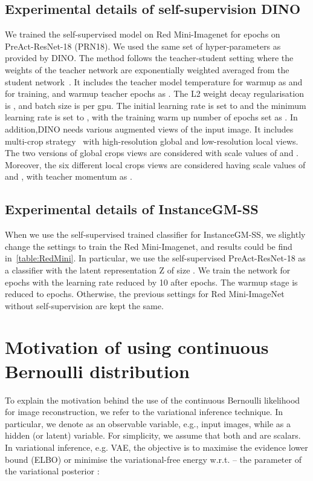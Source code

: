 \documentclass[10pt,twocolumn,letterpaper]{article}
\begin{document}
    \subsection{Experimental details of self-supervision DINO}\label{subsec:exp_self_dino}
        We trained the  self-supervised model on Red Mini-Imagenet for  epochs on  PreAct-ResNet-18 (PRN18). We used the same set of hyper-parameters as provided by DINO. The method follows the teacher-student setting where the weights of the teacher network are exponentially weighted averaged from the student network~\cite{he2020momentum}. It includes the teacher model temperature for warmup as  and  for training, and warmup teacher epochs as . The L2 weight decay regularisation is , and batch size is  per gpu. The initial learning rate is set to  and the minimum learning rate is set to , with the training warm up number of epochs set as . In addition,DINO needs various augmented views of the input image. It includes multi-crop strategy~\cite{caron2020unsupervised} with high-resolution global and low-resolution local views.
        The two versions of global crops views are considered with scale values of  and . Moreover, the six different local crops views are considered having scale values of  and , with teacher momentum as . 

    \subsection{Experimental details of InstanceGM-SS}\label{subsec:exp_self_instances}
        When we use the self-supervised trained classifier for InstanceGM-SS, we slightly change  the settings to train the Red Mini-Imagenet, and results could be find in~\cref{table:RedMini}. 
In particular, we use the self-supervised  PreAct-ResNet-18 as a classifier with the latent representation Z of size . We train the network for  epochs with the learning rate reduced by 10 after  epochs. The warmup stage is reduced to  epochs. Otherwise, the previous settings for Red Mini-ImageNet without self-supervision are kept the same.




\section{Motivation of using continuous Bernoulli distribution}\label{sec:motivation_cb}
    To explain the motivation behind the use of the continuous Bernoulli likelihood for image reconstruction, we refer to the variational inference technique. In particular, we denote  as an observable variable, e.g., input images, while  as a hidden (or latent) variable. For simplicity, we assume that both  and  are scalars. In variational inference, e.g. VAE, the objective is to maximise the evidence lower bound (ELBO) or minimise the variational-free energy w.r.t.  -- the parameter of the variational posterior :
    
\end{document}
